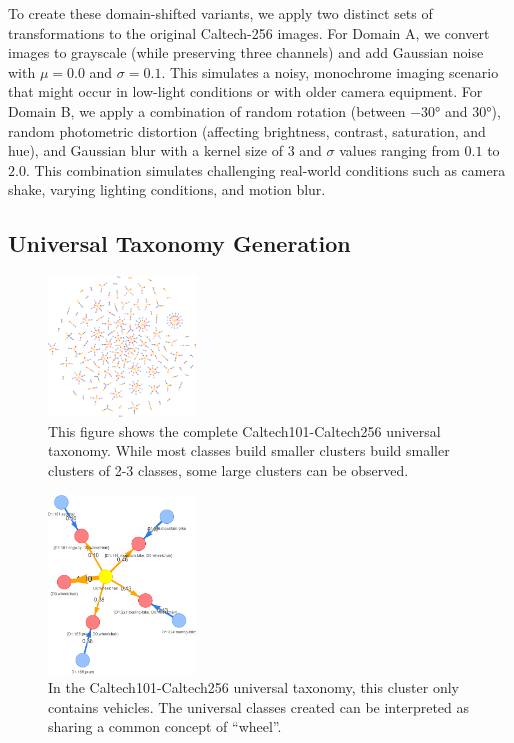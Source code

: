 To create these domain-shifted variants, we apply two distinct sets of transformations to the original Caltech-256 images.
For Domain A, we convert images to grayscale (while preserving three channels) and add Gaussian noise with $\mu=0.0$ and $\sigma=0.1$.
This simulates a noisy, monochrome imaging scenario that might occur in low-light conditions or with older camera equipment.
For Domain B, we apply a combination of random rotation (between $-30°$ and $30°$), random photometric distortion (affecting brightness, contrast, saturation, and hue),
and Gaussian blur with a kernel size of $3$ and $\sigma$ values ranging from $0.1$ to $2.0$.
This combination simulates challenging real-world conditions such as camera shake, varying lighting conditions, and motion blur.


\subsection{Universal Taxonomy Generation}

\begin{figure}[ht]
      \centering
      \includegraphics[width=0.35\textwidth]{figures/taxonomy.png}

      \caption{This figure shows the complete Caltech101-Caltech256 universal taxonomy.
            While most classes build smaller clusters build smaller clusters of 2-3 classes,
            some large clusters can be observed.}
      \label{fig:taxonomy}
\end{figure}

\begin{figure}[ht]
      \centering
      \includegraphics[width=0.35\textwidth]{figures/wheel_concept.png}

      \caption{In the Caltech101-Caltech256 universal taxonomy,
            this cluster only contains vehicles. The universal classes created can be interpreted as
            sharing a common concept of \enquote{wheel}.}
      \label{fig:wheel_concept}
\end{figure}

